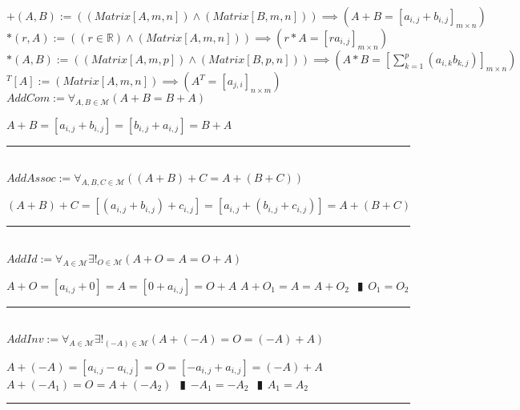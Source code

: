 \documentclass{book}
\newcommand{\abr}{:=}
\newcommand{\pipe}{$\phantom{(}\vrectangleblack\phantom{)}$}
\begin{document}
$+(A, B) \abr ((Matrix[A, m, n]) \land (Matrix[B, m, n])) \implies (A + B = [a_{i, j} + b_{i, j}]_{m \times n}) $ \\
$*(r, A) \abr ((r \in \mathbb{R}) \land (Matrix[A, m, n])) \implies (r * A = [r a_{i, j}]_{m \times n})$ \\
$*(A, B) \abr ((Matrix[A, m, p]) \land (Matrix[B, p, n])) \implies (A * B = \left[\sum_{k = 1}^{p}(a_{i, k} b_{k, j})\right]_{m \times n})$ \\
$\phantom{ }^T[A] \abr (Matrix[A, m, n]) \implies (A^T = [a_{j, i}]_{n \times m})$ \\

$AddCom \abr \forall_{A, B \in \mathcal{M}}(A + B = B + A)$
\begin{enumerate}
  \lit $A + B = [a_{i, j} + b_{i, j}] = [b_{i, j} + a_{i, j}] = B + A$
\end{enumerate} \vspace{.75mm} \hrule \vspace{.75mm} \ \\

$AddAssoc \abr \forall_{A, B, C \in \mathcal{M}}((A + B) + C = A + (B + C))$
\begin{enumerate}
  \lit $(A + B) + C = [(a_{i, j} + b_{i, j}) + c_{i, j}] = [a_{i, j} + (b_{i, j} + c_{i, j})] = A + (B + C)$
\end{enumerate} \vspace{.75mm} \hrule \vspace{.75mm} \ \\

$AddId \abr \forall_{A \in \mathcal{M}} \exists!_{O \in \mathcal{M}}(A + O = A = O + A)$
\begin{enumerate}
  \lit $A + O = [a_{i, j} + 0] = A = [0 + a_{i, j}] = O + A$
  \lit $A + O_1 = A = A + O_2$ \pipe $O_1 = O_2$
\end{enumerate} \vspace{.75mm} \hrule \vspace{.75mm} \ \\

$AddInv \abr \forall_{A \in \mathcal{M}} \exists!_{(-A) \in \mathcal{M}}(A + (-A) = O = (-A) + A)$
\begin{enumerate}
  \lit $A + (-A) = [a_{i, j} - a_{i, j}] = O = [-a_{i, j} + a_{i, j}] = (-A) + A$
  \lit $A + (-A_1) = O = A + (-A_2)$ \pipe $-A_1 = -A_2$ \pipe $A_1 = A_2$
\end{enumerate} \vspace{.75mm} \hrule \vspace{.75mm} \ \\ 
\end{document}
